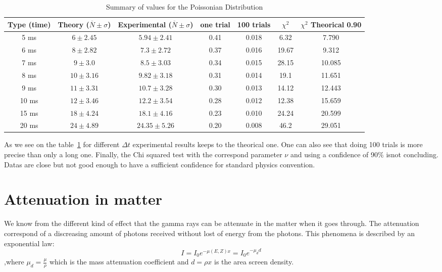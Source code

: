\documentclass[a4paper,12pt,oneside]{article}
\begin{document}
\begin{table}[h!]
\centering
	\begin{tabular}{|c|c|c|c|c|c|c|}
	   \hline
	   Type (time) & Theory ($\overline{N}\pm\sigma$)& Experimental ($\overline{N}\pm\sigma$) & one trial & 100 trials & $\chi^2$  & $\chi^2$ Theorical 0.90\\
		\hline
	   5 ms & $6\pm 2.45$ & $5.94\pm 2.41$ & 0.41 & 0.018 & 6.32 & 7.790\\
	   6 ms & $8\pm 2.82$ & $7.3\pm 2.72$ & 0.37 & 0.016 & 19.67 & 9.312\\
	   7 ms & $9\pm 3.0$ & $8.5\pm 3.03$ & 0.34 & 0.015 & 28.15 & 10.085\\
	   8 ms & $10\pm 3.16$ & $9.82\pm 3.18$ & 0.31 & 0.014 & 19.1 & 11.651\\
	   9 ms & $11\pm 3.31$ & $10.7\pm 3.28$ & 0.30 & 0.013 & 14.12 & 12.443\\
	   10 ms & $12\pm 3.46$ & $12.2\pm 3.54$ & 0.28 & 0.012 & 12.38 & 15.659\\
	   15 ms & $18\pm 4.24$ & $18.1\pm 4.16$ & 0.23 & 0.010 & 24.24 & 20.599\\
	   20 ms & $24\pm 4.89$ & $24.35\pm 5.26$ & 0.20 & 0.008 & 46.2 & 29.051\\
		\hline
	\end{tabular}
	\caption{Summary of values for the Poissonian Distribution}
	\label{tab:poisson}
\end{table}

As we see on the table~\ref{tab:poisson} for different $\Delta t$ experimental results keeps to the theorical one. One can also see that doing 100 trials is more precise than only a long one. Finally, the Chi squared test with the correspond parameter $\nu$ and using a confidence of 90$\%$ isnot concluding. Datas are close but not good enough to have a sufficient confidence for standard physics convention.

\newpage
\section{Attenuation in matter}
We know from the different kind of effect that the gamma rays can be attenuate in the matter when it goes through. The attenuation correspond of a discreasing amount of photons received without lost of energy from the photons.
This phenomena is described by an exponential law:
$$I=I_0e^{-\mu(E,Z)x}=I_0 e^{-\mu_d d}$$
,where $\mu_d=\frac{\mu}{\rho}$ which is the mass attenuation coefficient and $d=\rho x$ is the area screen density.
\end{document}
